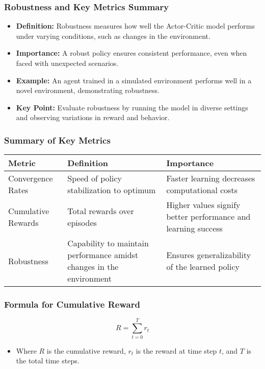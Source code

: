 \documentclass{beamer}
\begin{document}
\begin{frame}[fragile]
    \frametitle{Robustness and Key Metrics Summary}
    \begin{itemize}
        \item \textbf{Definition:} Robustness measures how well the Actor-Critic model performs under varying conditions, such as changes in the environment.
        \item \textbf{Importance:} A robust policy ensures consistent performance, even when faced with unexpected scenarios.
        \item \textbf{Example:} An agent trained in a simulated environment performs well in a novel environment, demonstrating robustness.
        \item \textbf{Key Point:} Evaluate robustness by running the model in diverse settings and observing variations in reward and behavior.
    \end{itemize}
\end{frame}

\begin{frame}[fragile]
    \frametitle{Summary of Key Metrics}
    \begin{tabular}{|l|l|l|}
        \hline
        \textbf{Metric} & \textbf{Definition} & \textbf{Importance} \\
        \hline
        Convergence Rates & Speed of policy stabilization to optimum & Faster learning decreases computational costs \\
        \hline
        Cumulative Rewards & Total rewards over episodes & Higher values signify better performance and learning success \\
        \hline
        Robustness & Capability to maintain performance amidst changes in the environment & Ensures generalizability of the learned policy \\
        \hline
    \end{tabular}
\end{frame}

\begin{frame}[fragile]
    \frametitle{Formula for Cumulative Reward}
    \begin{equation}
        R = \sum_{t=0}^{T} r_t 
    \end{equation}
    \begin{itemize}
        \item Where \( R \) is the cumulative reward, \( r_t \) is the reward at time step \( t \), and \( T \) is the total time steps.
    \end{itemize}
\end{frame}
\end{document}
